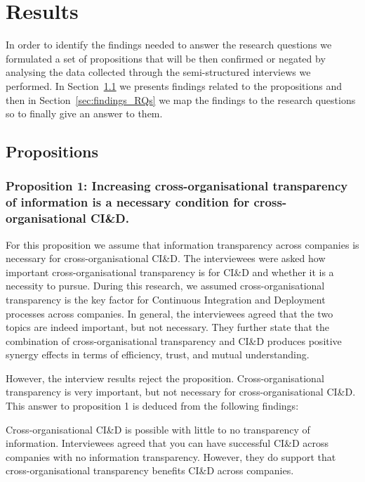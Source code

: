 \section{Results}\label{sec:results}

In order to identify the findings needed to answer the research questions we formulated a set of propositions that will be then confirmed or negated by analysing the data collected through the semi-structured interviews we performed. In Section~\ref{sec:propositions} we presents findings related to the propositions and then in Section~\ref{sec:findings_RQs} we map the findings to the research questions so to finally give an answer to them.

\subsection{Propositions}\label{sec:propositions}

\subsubsection{Proposition 1: Increasing cross-organisational transparency of information is a necessary condition for cross-organisational CI\&D.}

For this proposition we assume that information transparency across companies is necessary for cross-organisational CI\&D. The interviewees were asked how important cross-organisational transparency is for CI\&D and whether it is a necessity to pursue. During this research, we assumed cross-organisational transparency is the key factor for Continuous Integration and Deployment processes across companies. In general, the interviewees agreed that the two topics are indeed important, but not necessary. They further state that the combination of cross-organisational transparency and CI\&D produces positive synergy effects in terms of efficiency, trust, and mutual understanding.

However, the interview results reject the proposition. Cross-organisational transparency is very important, but not necessary for cross-organisational CI\&D. This answer to proposition 1 is deduced from the following findings:

 Cross-organisational CI\&D is possible with little to no transparency of information. Interviewees agreed that you can have successful CI\&D across companies with no information transparency. However, they do support that cross-organisational transparency benefits CI\&D across companies.


